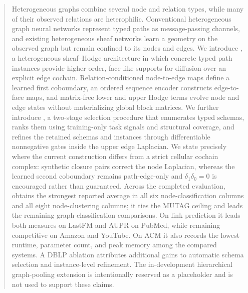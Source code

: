 \author{Peeradon Sarnkaew}
\renewcommand{\shortauthors}{Sarnkaew}



\begin{abstract}
Heterogeneous graphs combine several node and relation types, while many of their observed
relations are heterophilic. Conventional heterogeneous graph neural networks represent typed
paths as message-passing channels, and existing heterogeneous sheaf networks learn a geometry on
the observed graph but remain confined to its nodes and edges. We introduce \method, a
heterogeneous sheaf--Hodge architecture in which concrete typed path instances provide
higher-order, face-like supports for diffusion over an explicit edge cochain. Relation-conditioned
node-to-edge maps define a learned first coboundary, an ordered sequence encoder constructs
edge-to-face maps, and matrix-free lower and upper Hodge terms evolve node and edge states without
materializing global block matrices. We further introduce \ampss, a two-stage selection procedure
that enumerates typed schemas, ranks them using training-only task signals and structural coverage,
and refines the retained schemas and instances through differentiable nonnegative gates inside the
upper edge Laplacian. We state precisely where the current construction differs from a strict
cellular cochain complex: synthetic closure pairs correct the node Laplacian, whereas the learned
second coboundary remains path-edge-only and $\delta_1\delta_0=0$ is encouraged rather than
guaranteed. Across the completed evaluation, \method{} obtains the strongest reported average in
all six node-classification columns and all eight node-clustering columns; it ties the MUTAG
ceiling and leads the remaining graph-classification comparisons. On link prediction it leads
both measures on LastFM and AUPR on PubMed, while remaining competitive on Amazon and YouTube.
On ACM it also records the lowest runtime, parameter count, and peak memory among the compared
systems. A DBLP ablation attributes additional gains to automatic schema selection and
instance-level refinement. The in-development \thspool{} hierarchical graph-pooling extension is
intentionally reserved as a placeholder and is not used to support these claims.
\end{abstract}



